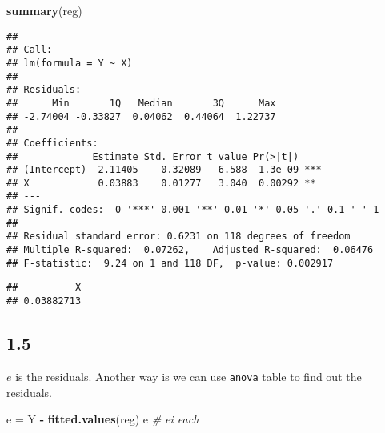 \documentclass[
]{article}
\newenvironment{Shaded}{\begin{snugshade}}{\end{snugshade}}
\newcommand{\CommentTok}[1]{\textcolor[rgb]{0.56,0.35,0.01}{\textit{#1}}}
\newcommand{\DecValTok}[1]{\textcolor[rgb]{0.00,0.00,0.81}{#1}}
\newcommand{\KeywordTok}[1]{\textcolor[rgb]{0.13,0.29,0.53}{\textbf{#1}}}
\newcommand{\NormalTok}[1]{#1}
\newcommand{\OperatorTok}[1]{\textcolor[rgb]{0.81,0.36,0.00}{\textbf{#1}}}
\newcommand{\StringTok}[1]{\textcolor[rgb]{0.31,0.60,0.02}{#1}}
\begin{document}
\begin{Shaded}
\begin{Highlighting}[]
\KeywordTok{summary}\NormalTok{(reg)}
\end{Highlighting}
\end{Shaded}

\begin{verbatim}
## 
## Call:
## lm(formula = Y ~ X)
## 
## Residuals:
##      Min       1Q   Median       3Q      Max 
## -2.74004 -0.33827  0.04062  0.44064  1.22737 
## 
## Coefficients:
##             Estimate Std. Error t value Pr(>|t|)    
## (Intercept)  2.11405    0.32089   6.588  1.3e-09 ***
## X            0.03883    0.01277   3.040  0.00292 ** 
## ---
## Signif. codes:  0 '***' 0.001 '**' 0.01 '*' 0.05 '.' 0.1 ' ' 1
## 
## Residual standard error: 0.6231 on 118 degrees of freedom
## Multiple R-squared:  0.07262,    Adjusted R-squared:  0.06476 
## F-statistic:  9.24 on 1 and 118 DF,  p-value: 0.002917
\end{verbatim}

\begin{Shaded}
\end{Shaded}

\begin{verbatim}
##          X 
## 0.03882713
\end{verbatim}

\hypertarget{section-4}{%
\subsection{1.5}\label{section-4}}

\(e\) is the residuals. Another way is we can use \texttt{anova} table
to find out the residuals.

\begin{Shaded}
\begin{Highlighting}[]
\NormalTok{e =}\StringTok{ }\NormalTok{Y }\OperatorTok{-}\StringTok{ }\KeywordTok{fitted.values}\NormalTok{(reg)}
\NormalTok{e }\CommentTok{# ei each}
\end{Highlighting}
\end{Shaded}
\end{document}
